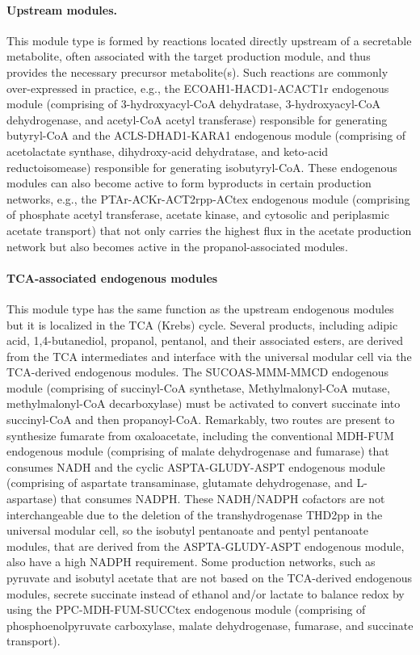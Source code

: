\paragraph{Upstream modules.}
This module  type is formed by reactions located directly upstream of a secretable metabolite, often associated with the target production module, and thus provides the necessary precursor metabolite(s). Such reactions are commonly over-expressed in practice, e.g., the ECOAH1-HACD1-ACACT1r endogenous module (comprising of 3-hydroxyacyl-CoA dehydratase, 3-hydroxyacyl-CoA dehydrogenase, and acetyl-CoA acetyl transferase) responsible for generating butyryl-CoA and  the ACLS-DHAD1-KARA1 endogenous module (comprising of acetolactate synthase, dihydroxy-acid dehydratase, and keto-acid reductoisomease) responsible for generating isobutyryl-CoA.
These endogenous modules can also become active to form byproducts in certain production networks, e.g., the PTAr-ACKr-ACT2rpp-ACtex  endogenous module (comprising of phosphate acetyl transferase, acetate kinase, and cytosolic and periplasmic acetate transport) that not only carries the highest flux in the acetate production network but also becomes active in the propanol-associated modules.

\paragraph{TCA-associated endogenous modules}
This module type has the same function as the upstream endogenous modules but it is localized in the TCA (Krebs) cycle.
Several products, including adipic acid, 1,4-butanediol, propanol, pentanol, and their associated esters, are derived from the TCA intermediates and interface with the universal modular cell via the TCA-derived endogenous modules.
The SUCOAS-MMM-MMCD endogenous module (comprising of succinyl-CoA synthetase, Methylmalonyl-CoA mutase, methylmalonyl-CoA decarboxylase) must be activated to convert succinate into succinyl-CoA and then propanoyl-CoA. Remarkably, two routes are present to synthesize fumarate from oxaloacetate, including the conventional MDH-FUM endogenous module (comprising of malate dehydrogenase and fumarase) that consumes NADH and the cyclic ASPTA-GLUDY-ASPT endogenous module (comprising of aspartate transaminase, glutamate dehydrogenase, and L-aspartase) that consumes NADPH. These NADH/NADPH cofactors are not interchangeable due to the deletion of the transhydrogenase THD2pp in the universal modular cell, so the isobutyl pentanoate and pentyl pentanoate modules, that are derived from the ASPTA-GLUDY-ASPT endogenous module, also have a high NADPH requirement. Some production networks, such as pyruvate and isobutyl acetate that are not based on the TCA-derived endogenous modules, secrete succinate instead of ethanol and/or lactate to balance redox by using the PPC-MDH-FUM-SUCCtex endogenous module (comprising of phosphoenolpyruvate carboxylase, malate dehydrogenase, fumarase, and succinate transport).

